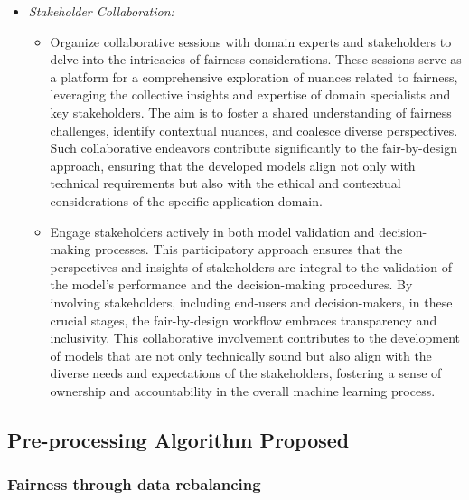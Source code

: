 \documentclass[12pt,a4paper,openright,twoside]{book}
\begin{document}
\begin{itemize}
    
    \item \emph{Stakeholder Collaboration:}
    
    \begin{itemize}
    
        \item Organize collaborative sessions with domain experts and stakeholders to delve into the intricacies of fairness considerations. These sessions serve as a platform for a comprehensive exploration of nuances related to fairness, leveraging the collective insights and expertise of domain specialists and key stakeholders. The aim is to foster a shared understanding of fairness challenges, identify contextual nuances, and coalesce diverse perspectives. Such collaborative endeavors contribute significantly to the fair-by-design approach, ensuring that the developed models align not only with technical requirements but also with the ethical and contextual considerations of the specific application domain.
    
        
        \item Engage stakeholders actively in both model validation and decision-making processes. This participatory approach ensures that the perspectives and insights of stakeholders are integral to the validation of the model's performance and the decision-making procedures. By involving stakeholders, including end-users and decision-makers, in these crucial stages, the fair-by-design workflow embraces transparency and inclusivity. This collaborative involvement contributes to the development of models that are not only technically sound but also align with the diverse needs and expectations of the stakeholders, fostering a sense of ownership and accountability in the overall machine learning process.
    
    \end{itemize}

\end{itemize}

\subsection{Pre-processing Algorithm Proposed}

\subsubsection{Fairness through data rebalancing}
\label{subsec:ftdr}
\end{document}
